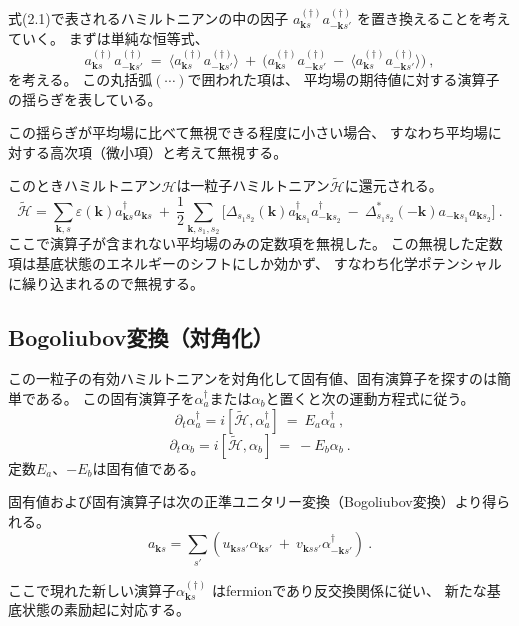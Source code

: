 \documentclass[uplatex,a4j,12pt,dvipdfmx]{jsarticle}
\begin{document}
式(2.1)で表されるハミルトニアンの中の因子
$
	a_{\bm{k}s}^{(\dagger)}
	a_{-\bm{k}s'}^{(\dagger)}
$
を置き換えることを考えていく。
まずは単純な恒等式、
\[
	a_{\bm{k}s}^{(\dagger)}
	a_{-\bm{k}s'}^{(\dagger)}
	\ = \
	\langle
	a_{\bm{k}s}^{(\dagger)}
	a_{-\bm{k}s'}^{(\dagger)}
	\rangle
	\ + \
	\Big(
	a_{\bm{k}s}^{(\dagger)}
	a_{-\bm{k}s'}^{(\dagger)}
	\ - \
	\langle
	a_{\bm{k}s}^{(\dagger)}
	a_{-\bm{k}s'}^{(\dagger)}
	\rangle
	\Big)
	\ ,
\]
を考える。
この丸括弧$ ( \cdots )$で囲われた項は、
平均場の期待値に対する演算子の揺らぎを表している。

この揺らぎが平均場に比べて無視できる程度に小さい場合、
すなわち平均場に対する高次項（微小項）と考えて無視する。

このときハミルトニアン$\mathcal{H}$は一粒子ハミルトニアン$\tilde{\mathcal{H}}$に還元される。
\[
	\tilde{\mathcal{H}}
	=
	\sum_{\bm{k},s}
	\varepsilon(\bm{k})
	a_{\bm{k} s}^{\dagger}
	a_{\bm{k} s}
	\ + \
	\dfrac{1}{2}
	\sum_{\bm{k},s_{1},s_{2}}
	\Big[
		\Delta_{ s_{1} s_{2} }( \bm{k} )
		a_{\bm{k} s_{1}}^{\dagger}
		a_{-\bm{k} s_{2}}^{\dagger}
		\ - \
		\Delta_{ s_{1} s_{2} }^{*}( - \bm{k} )
		a_{-\bm{k} s_{1}}
		a_{\bm{k} s_{2}}
		\Big]
	\ .
\]
ここで演算子が含まれない平均場のみの定数項を無視した。
この無視した定数項は基底状態のエネルギーのシフトにしか効かず、
すなわち化学ポテンシャルに繰り込まれるので無視する。
\subsection{Bogoliubov変換（対角化）}
この一粒子の有効ハミルトニアンを対角化して固有値、固有演算子を探すのは簡単である。
この固有演算子を$\alpha_{a}^{\dagger}$または$\alpha_{b}$と置くと次の運動方程式に従う。
\[
	\partial_{t} \alpha_{a}^{\dagger}
	=
	i [ \tilde{\mathcal{H}} , \alpha_{a}^{\dagger} ]
	\ = \
	E_{a} \alpha_{a}^{\dagger}
	\ ,
\]\[
	\partial_{t} \alpha_{b}
	=
	i [ \tilde{\mathcal{H}} , \alpha_{b} ]
	\ = \
	- E_{b} \alpha_{b}
	\ .
\]
定数$E_{a}$、$-E_{b}$は固有値である。

固有値および固有演算子は次の正準ユニタリー変換（Bogoliubov変換）より得られる。
\[
	a_{\bm{k} s}
	=
	\sum_{s'}
	(
	u_{\bm{k} s s'}
	\alpha_{\bm{k} s'}
	\ + \
	v_{\bm{k} s s'}
	\alpha_{ - \bm{k} s'}^{\dagger}
	)
	\ .
\]

ここで現れた新しい演算子$\alpha_{\bm{k}s}^{(\dagger)}$
はfermionであり反交換関係に従い、
新たな基底状態の素励起に対応する。
\end{document}
